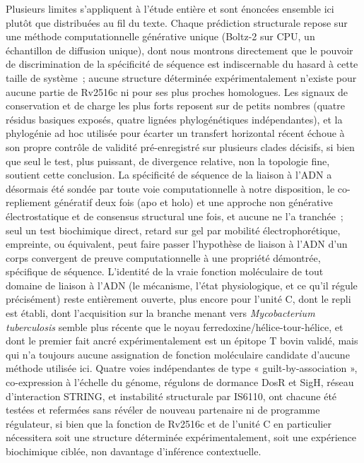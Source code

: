 \documentclass[11pt,a4paper]{article}
\newcommand{\mtb}{\textit{Mycobacterium tuberculosis}}
\begin{document}
Plusieurs limites s'appliquent à l'étude entière et sont énoncées ensemble ici plutôt que
distribuées au fil du texte. Chaque prédiction structurale repose sur une méthode computationnelle
générative unique (Boltz-2 sur CPU, un échantillon de diffusion unique), dont nous montrons
directement que le pouvoir de discrimination de la spécificité de séquence est indiscernable du
hasard à cette taille de système~; aucune structure déterminée expérimentalement n'existe pour
aucune partie de Rv2516c ni pour ses plus proches homologues. Les
signaux de conservation et de charge les plus forts reposent sur de petits nombres (quatre résidus
basiques exposés, quatre lignées phylogénétiques indépendantes), et la phylogénie ad hoc utilisée
pour écarter un transfert horizontal récent échoue à son propre contrôle de validité pré-enregistré
sur plusieurs clades décisifs, si bien que seul le test, plus puissant, de divergence relative, non
la topologie fine, soutient cette conclusion. La spécificité de séquence de la liaison à l'ADN a
désormais été sondée par toute voie computationnelle à notre disposition, le co-repliement génératif
deux fois (apo et holo) et une approche non générative électrostatique et de consensus structural
une fois, et aucune ne l'a tranchée~; seul un test biochimique direct, retard sur gel par mobilité
électrophorétique, empreinte, ou équivalent, peut faire passer l'hypothèse de liaison à l'ADN d'un
corps convergent de preuve computationnelle à une propriété démontrée, spécifique de séquence.
L'identité de la vraie fonction moléculaire de tout domaine de liaison à l'ADN (le mécanisme, l'état
physiologique, et ce qu'il régule précisément) reste entièrement ouverte, plus encore pour l'unité
C, dont le repli est établi, dont l'acquisition sur la branche menant vers \mtb{} semble plus récente
que le noyau ferredoxine/hélice-tour-hélice, et dont le premier fait ancré expérimentalement est un
épitope T bovin validé, mais qui n'a toujours aucune assignation de fonction moléculaire candidate
d'aucune méthode utilisée ici. Quatre voies indépendantes de type « guilt-by-association »,
co-expression à l'échelle du génome, régulons de dormance DosR et SigH, réseau d'interaction STRING,
et instabilité structurale par IS6110, ont chacune été testées et refermées sans révéler de nouveau
partenaire ni de programme régulateur, si bien que la fonction de Rv2516c et de l'unité C en
particulier nécessitera soit une structure déterminée expérimentalement, soit une expérience
biochimique ciblée, non davantage d'inférence contextuelle.
\end{document}
